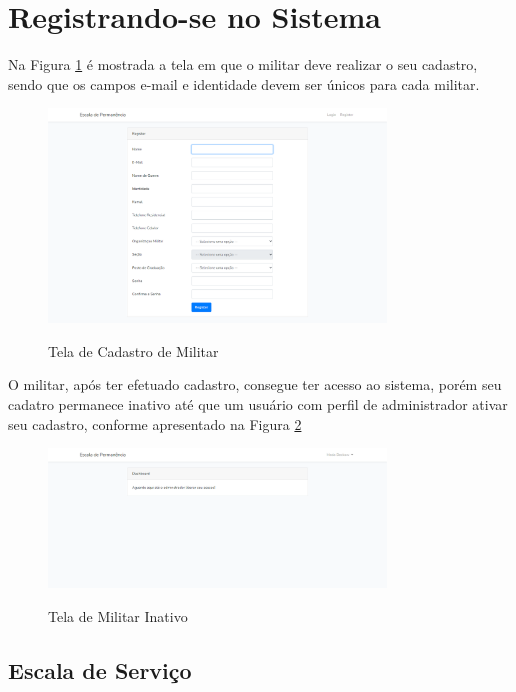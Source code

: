 \section{Registrando-se no Sistema}

Na Figura \ref{fig:singnup} é mostrada a tela em que o militar deve realizar o seu cadastro, sendo que os campos e-mail e identidade devem ser únicos para cada militar.

\begin{figure}[!htb]
    \centering
    \caption{Tela de Cadastro de Militar}
    \includegraphics[width=0.8\textwidth]{images/2 - Tela de Cadastro.png}
    \label{fig:singnup}
\end{figure}

O militar, após ter efetuado cadastro, consegue ter acesso ao sistema, porém seu cadatro permanece inativo até que um usuário com perfil de administrador ativar seu cadastro, conforme apresentado na Figura \ref{fig:userinative}

\begin{figure}[!htb]
    \centering
    \caption{Tela de Militar Inativo}
    \includegraphics[width=0.8\textwidth]{images/3 - Tela de Militar Inativo.png}
    \label{fig:userinative}
\end{figure}

\subsection{Escala de Serviço}

